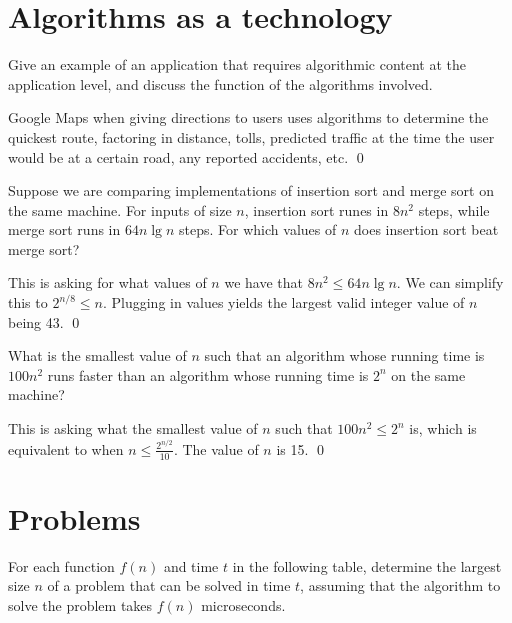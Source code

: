 \section{Algorithms as a technology}
 Give an example of an application that requires algorithmic content at the application level, and discuss the function of the algorithms involved.

\sol Google Maps when giving directions to users uses algorithms to determine the quickest route, factoring in distance, tolls, predicted traffic at the time the user would be at a certain road, any reported accidents, etc. \qed

 Suppose we are comparing implementations of insertion sort and merge sort on the same machine. For inputs of size $n$, insertion sort runes in $8n^2$ steps, while merge sort runs in $64n \lg n$ steps. For which values of $n$ does insertion sort beat merge sort?

\sol This is asking for what values of $n$ we have that $8n^2 \leq 64 n \lg n$. We can simplify this to $2^{n/8} \leq n$. Plugging in values yields the largest valid integer value of $n$ being 43. \qed

 What is the smallest value of $n$ such that an algorithm whose running time is $100n^2$ runs faster than an algorithm whose running time is $2^n$ on the same machine?

\sol This is asking what the smallest value of $n$ such that $100n^2 \leq 2^n$ is, which is equivalent to when $n \leq \frac{2^{n/2}}{10}$. The value of $n$ is 15. \qed

\section{Problems}
 For each function $f(n)$ and time $t$ in the following table, determine the largest size $n$ of a problem that can be solved in time $t$, assuming that the algorithm to solve the problem takes $f(n)$ microseconds.

\sol \newline

